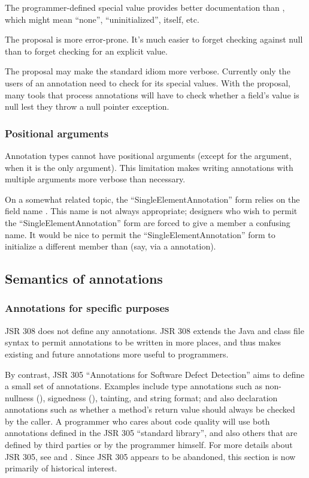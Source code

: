 \documentclass[10pt]{article}
\begin{document}
The programmer-defined special value provides better documentation than
, which might mean ``none'', ``uninitialized'', 
itself, etc.

The proposal is more error-prone.  It's much easier to forget checking
against null than to forget checking for an explicit value.

The proposal may make the standard idiom more verbose.  Currently only the
users of an annotation need to check for its special values.  With the
proposal, many tools that process annotations will have to check whether a
field's value is null lest they throw a null pointer exception.


\subsubsection{Positional arguments\label{positional-arguments}}

Annotation types cannot have positional arguments (except for the
 argument, when it is the only argument).  This limitation
makes writing annotations with multiple arguments more verbose than
necessary.

On a somewhat related topic, the ``SingleElementAnnotation'' form relies on
the field name .  This name is not always appropriate;
designers who wish to permit the ``SingleElementAnnotation'' form are
forced to give a member a confusing name.  It would be nice to permit the
``SingleElementAnnotation'' form to initialize a different member than
 (say, via a  annotation).


\subsection{Semantics of annotations\label{semantics}}

\subsubsection{Annotations for specific purposes\label{no-defined-annotations}}

JSR 308 does not define any annotations.
JSR 308 extends the Java and class file syntax to permit
annotations to be written in more places, and thus makes existing and
future annotations more useful to programmers.

By contrast, JSR 305 ``Annotations for Software Defect Detection'' aims to
define a small set of annotations.
Examples include type annotations such as non-nullness
(), signedness (), tainting, and string
format; and also declaration annotations such as whether a method's return
value should always be checked by the caller.
A programmer who cares about code quality will use both annotations
defined in the JSR 305 ``standard library'', and also others that are
defined by third parties or by the programmer himself.
For more details about JSR 305, see
 and
.
Since JSR 305 appears to be abandoned, this section is now primarily of
historical interest.
\end{document}
